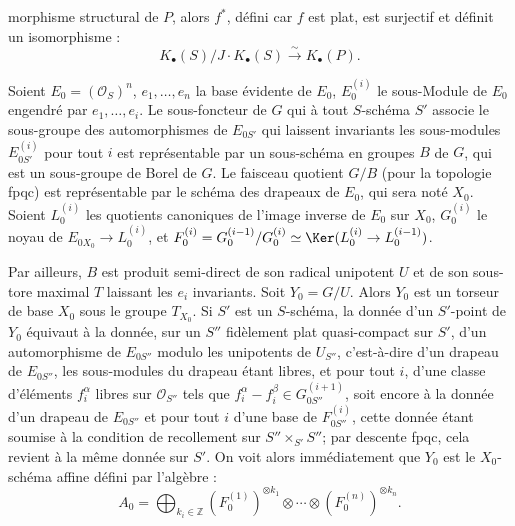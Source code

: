 morphisme structural de $P$, alors $f^*$, défini car $f$ est plat, est surjectif et définit un isomorphisme :
\[
K_\bullet(S)/J\cdot K_\bullet(S)\xrightarrow{\sim}K_\bullet(P).
\]

Soient $E_0=(\mathcal O_S)^n$, $e_1,\ldots,e_n$ la base évidente de $E_0$, $E_0^{(i)}$ le sous-Module de $E_0$ engendré par $e_1,\ldots,e_i$. Le sous-foncteur de $G$ qui à tout $S$-schéma $S'$ associe le sous-groupe des automorphismes de $E_{0S'}$ qui laissent invariants les sous-modules $E_{0S'}^{(i)}$ pour tout $i$ est représentable par un sous-schéma en groupes $B$ de $G$, qui est un sous-groupe de Borel de $G$. Le faisceau quotient $G/B$ (pour la topologie fpqc) est représentable par le schéma des drapeaux de $E_0$, qui sera noté $X_0$. Soient $L_0^{(i)}$ les quotients canoniques de l'image inverse de $E_0$ sur $X_0$, $G_0^{(i)}$ le noyau de $E_{0X_0}\to L_0^{(i)}$, et $F_0^{(i)}=G_0^{(i-1)}/G_0^{(i)}\simeq \Ker(L_0^{(i)}\to L_0^{(i-1)})$.

Par ailleurs, $B$ est produit semi-direct de son radical unipotent $U$ et de son sous-tore maximal $T$ laissant les $e_i$ invariants. Soit $Y_0=G/U$. Alors $Y_0$ est un torseur de base $X_0$ sous le groupe $T_{X_0}$. Si $S'$ est un $S$-schéma, la donnée d'un $S'$-point de $Y_0$ équivaut à la donnée, sur un $S''$ fidèlement plat quasi-compact sur $S'$, d'un automorphisme de $E_{0S''}$ modulo les unipotents de $U_{S''}$, c'est-à-dire d'un drapeau de $E_{0S''}$, les sous-modules du drapeau étant libres, et pour tout $i$, d'une classe d'éléments $f_i^\alpha$ libres sur $\mathcal O_{S''}$ tels que $f_i^\alpha-f_i^\beta\in G_{0S''}^{(i+1)}$, soit encore à la donnée d'un drapeau de $E_{0S''}$ et pour tout $i$ d'une base de $F_{0S''}^{(i)}$, cette donnée étant soumise à la condition de recollement sur $S''\times_{S'}S''$; par descente fpqc, cela revient à la même donnée sur $S'$. On voit alors immédiatement que $Y_0$ est le $X_0$-schéma affine défini par l'algèbre :
\[
A_0=\bigoplus_{k_i\in\mathbb Z}(F_0^{(1)})^{\otimes k_1}\otimes\cdots\otimes(F_0^{(n)})^{\otimes k_n}.
\]

